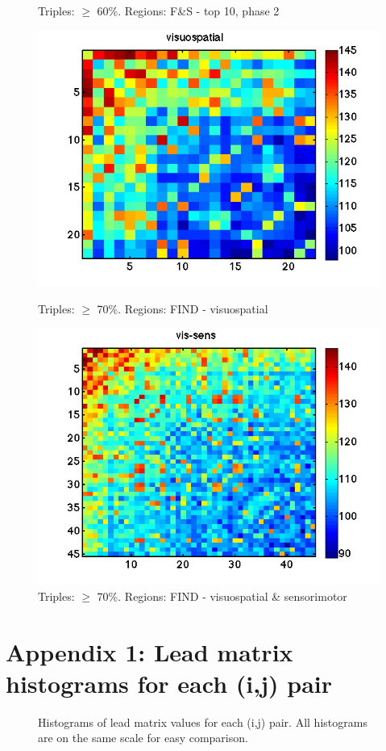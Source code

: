 \documentclass[11pt]{article}
\begin{document}
\begin{figure}[h]
\begin{minipage}{.45\textwidth}
\vskip -10pt
\caption{Triples: $\geq$ 60\%. Regions: F\&S - top 10, phase 2}
\end{minipage}
\vskip 20pt
\begin{minipage}{.45\textwidth}
\includegraphics[width=\textwidth]{pictures/correlations_FIND-visuospatial_c70.png}
\vskip -10pt
\caption{Triples: $\geq$ 70\%. Regions: FIND - visuospatial}
\end{minipage}
\hfill
\begin{minipage}{.45\textwidth}
\includegraphics[width=\textwidth]{pictures/correlations_FIND-vis-sens_c70.png}
\vskip -10pt
\caption{Triples: $\geq$ 70\%. Regions: FIND - visuospatial \& sensorimotor}
\end{minipage}
\end{figure}

\section{Appendix 1: Lead matrix histograms for each (i,j) pair}
\label{app:slm_hist}
\begin{figure}[H]

\caption{Histograms of lead matrix values for each (i,j) pair. All histograms are on the same scale for easy comparison.}
\end{figure}
\end{document}
